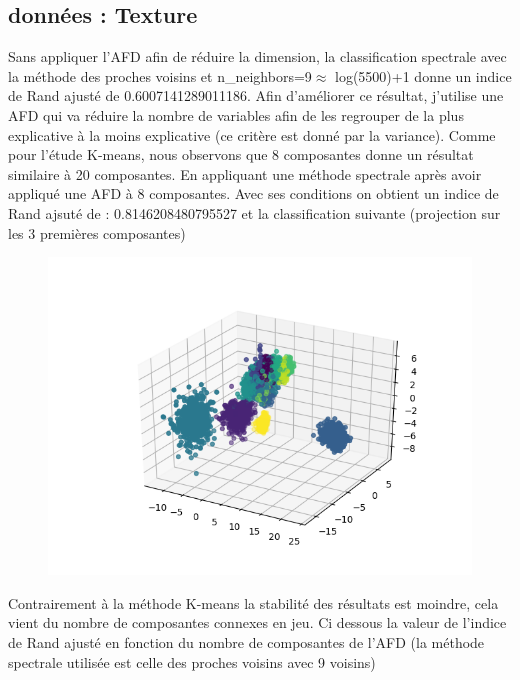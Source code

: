\documentclass[12pt]{scrartcl} %
\begin{document}
\subsection{données : Texture}
Sans appliquer l'AFD afin de réduire la dimension, la classification spectrale avec la méthode des proches voisins et n\_neighbors=9$\approx$ log(5500)+1 donne un indice de Rand ajusté de 0.6007141289011186. Afin d'améliorer ce résultat, j'utilise une AFD qui va réduire la nombre de variables afin de les regrouper de la plus explicative à la moins explicative (ce critère est donné par la variance). Comme pour l'étude K-means, nous observons que 8 composantes donne un résultat similaire à 20 composantes. En appliquant une méthode spectrale après avoir appliqué une AFD à 8 composantes. Avec ses conditions on obtient un indice de Rand ajsuté de : 0.8146208480795527 et la classification suivante (projection sur les 3 premières composantes)
\newline
\begin{figure}[!h]
 \centering 
\includegraphics[scale=.5]{spectraleAFD.png}
\end{figure}
\newline 
Contrairement à la méthode K-means la stabilité des résultats est moindre, cela vient du nombre de composantes connexes en jeu. Ci dessous la valeur de l'indice de Rand ajusté en fonction du nombre de composantes de l'AFD (la méthode spectrale utilisée est celle des proches voisins avec 9 voisins)
\newline
\end{document}
